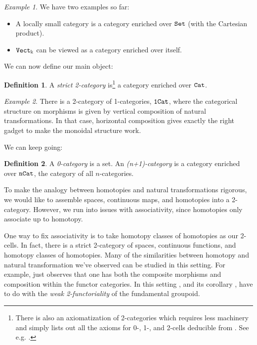 \documentclass[11 pt]{amsart}
\theoremstyle{plain}   %
\theoremstyle{definition}
\newtheorem{defn}{Definition}[section]
\theoremstyle{remark}
\newtheorem{ex}{Example}[section]
\numberwithin{equation}{section}
\newcommand{\cat}[1]{{\normalfont\texttt{#1}}}
\begin{document}
\begin{ex}We have two examples so far:
	\begin{itemize}
		\item A locally small category is a category enriched over $\cat{Set}$ (with
		      the Cartesian product).
		\item $\cat{Vect}_\Bbbk$ can be viewed as a category enriched over itself.
	\end{itemize}
\end{ex}

We can now define our main object:

\begin{defn}\label{2-category}	A \emph{strict 2-category} is\footnote{There is also an axiomatization of
		2-categories which requires less machinery and simply lists out all the axioms
		for 0-, 1-, and 2-cells deducible from . See e.g. \cite[Section
			1.7]{Riehl}.} a category enriched over $\cat{Cat}$.
\end{defn}

\begin{ex}
	There is a 2-category of 1-categories, $\cat{1Cat}$, where the categorical
	structure on morphisms is given by vertical composition of natural
	transformations. In that case, horizontal composition gives exactly the right
	gadget to make the monoidal structure work.
\end{ex}

We can keep going:

\begin{defn} A \emph{0-category} is a set. An \emph{(n+1)-category} is a category
	enriched over $\cat{nCat}$, the category of all $n$-categories.
\end{defn}

To make the analogy between homotopies and natural transformations rigorous, we
would like to assemble spaces, continuous maps, and homotopies into a
2-category. However, we run into issues with associativity, since homotopies
only associate up to homotopy.

One way to fix associativity is to take homotopy classes of homotopies as our
2-cells. In fact, there is a strict 2-category of spaces, continuous functions,
and homotopy classes of homotopies. Many of the similarities between homotopy
and natural transformation we've observed can be studied in this setting. For
example,  just observes that one has both the composite
morphisms and composition within the functor categories. In this setting
, and its corollary , have to do
with the \emph{weak 2-functoriality} of the fundamental groupoid.
\end{document}
